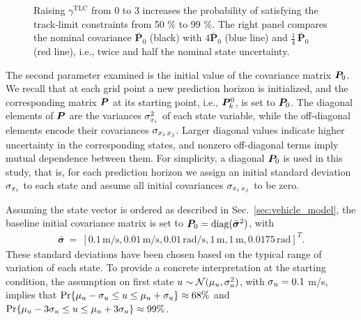 \begin{figure}
{Raising $\gamma^{\mathrm{TLC}}$ from 0 to 3 increases the probability of satisfying the track-limit constraints from 50 \% to 99 \%.
The right panel compares the nominal covariance $\bar{\mathbf P}_{0}$ (black) with $4\bar{\mathbf P}_{0}$ (blue line) and $\tfrac14\,\bar{\mathbf P}_{0}$ (red line), i.e., twice and half the nominal state uncertainty.
}
	\label{fig:ol_sensitivities}
\end{figure}

The second parameter examined is the initial value of the covariance matrix $\boldsymbol{P}_0$.
We recall that at each grid point a new prediction horizon is initialized, and the corresponding matrix $\boldsymbol{P}$ at its starting point, i.e., $\boldsymbol{P}^0_k$, is set to $\boldsymbol{P}_0$.
The diagonal elements of $\boldsymbol{P}$ are the variances $\sigma_{x_i}^2$  of each state variable, while the off-diagonal elements encode their covariances $\sigma_{x_i\,x_j}$. Larger diagonal values indicate higher uncertainty in the corresponding states, and nonzero off-diagonal terms imply mutual dependence between them. For simplicity, a diagonal $\boldsymbol{P}_0$ is used in this study, that is, for each prediction horizon we assign an initial standard deviation $\sigma_{x_i}$ to each state and assume all initial covariances $\sigma_{x_i\,x_j}$  to be zero.

 Assuming the state vector is ordered as described in Sec.~\ref{sec:vehicle_model}, the baseline initial covariance matrix is set to $\boldsymbol{P}_0=\operatorname{diag}(\bar{\boldsymbol{\sigma}}^2)$, with
\begin{align}
\bar{\boldsymbol{\sigma}}~=~\left[0.1\,\textrm{m/s}, 0.01\,\textrm{m/s}, 0.01\,\textrm{rad/s}, 1\,\textrm{m}, 1\,\textrm{m}, 0.0175\,\textrm{rad}\right]^T.
\end{align}
These standard deviations have been chosen based on the typical range of variation of each state. To provide a concrete interpretation at the starting condition, the assumption on first state $u \sim \mathcal{N}(\mu_u,\sigma_u^2)$, with $\sigma_u=0.1$ m/s, implies that
$\Pr\{\mu_u-\sigma_u \leq u \leq \mu_u+\sigma_u\}\approx 68\%$ and $\Pr\{\mu_u-3\sigma_u \leq u \leq \mu_u+3\sigma_u\}\approx 99\%$.

